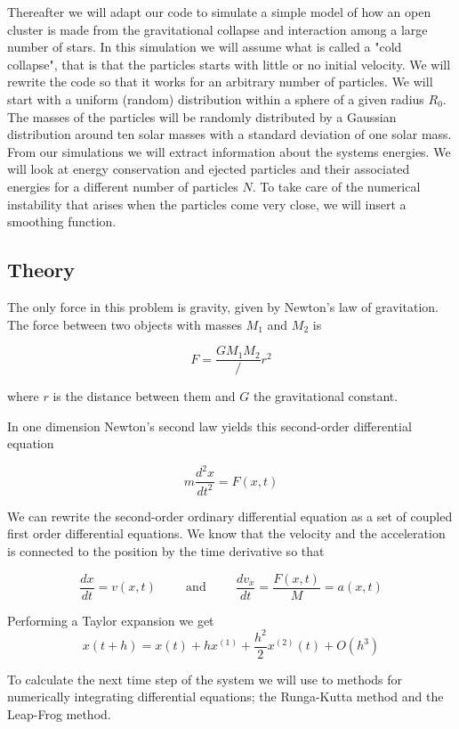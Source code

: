 \documentclass[a4paper,12pt, english]{article}
\begin{document}
Thereafter we will adapt our code to simulate a simple model of how an open cluster is made from the gravitational collapse and interaction among a large number of stars. In this simulation we will assume what is called a "cold collapse", that is that the particles starts with little or no initial velocity. We will rewrite the code so that it works for an arbitrary number of particles. We will start with a uniform (random) distribution within a sphere of a given radius $R_0$. The masses of the particles will be randomly distributed by a Gaussian distribution around ten solar masses with a standard deviation of one solar mass. From our simulations we will extract information about the systems energies. We will look at energy conservation and ejected particles and their associated energies for a different number of particles $N$. 
To take care of the numerical instability that arises when the particles come very close, we will insert a smoothing function.     


\subsection*{Theory}

The only force in this problem is gravity, given by Newton's law of gravitation. The force between two objects with masses $M_1$ and $M_2$ is 

\[
F = \frac{GM_1 M_2}/{r^2}
\]

where $r$ is the distance between them and $G$ the gravitational constant. 

In one dimension Newton's second law yields this second-order differential equation

$$m\frac{d^2x}{dt^2} = F(x,t)$$

We can rewrite the second-order ordinary differential equation as a set of coupled first order differential equations. 
We know that the velocity and the acceleration is connected to the position by the time derivative so that

\[
\frac{dx}{dt} = v(x,t) \hspace{1cm}\mathrm{and}\hspace{1cm}
\frac{dv_x}{dt} = \frac{F(x,t)}{M} = a(x,t)
\]

Performing a Taylor expansion we get 
\[
x(t+h) = x(t) + hx^{(1)} + \frac{h^2}{2}x^{(2)}(t) + O(h^3)
\]

To calculate the next time step of the system we will use to methods for numerically integrating differential equations; the Runga-Kutta method and the Leap-Frog method.
\end{document}
